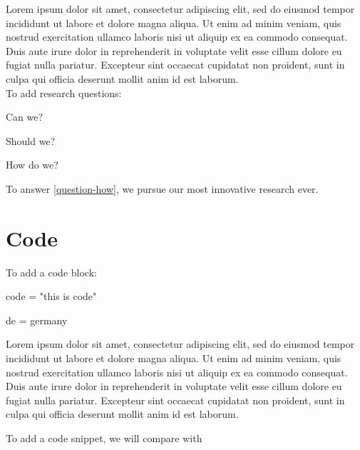 Lorem ipsum dolor sit amet, consectetur adipiscing elit, sed do eiusmod tempor incididunt ut labore et dolore magna aliqua. Ut enim ad minim veniam, quis nostrud exercitation ullamco laboris nisi ut aliquip ex ea commodo consequat. Duis aute irure dolor in reprehenderit in voluptate velit esse cillum dolore eu fugiat nulla pariatur. Excepteur sint occaecat cupidatat non proident, sunt in culpa qui officia deserunt mollit anim id est laborum.\\
To add research questions:


\begin{questions}
 \item Can we? \label{question-can}
 \item Should we? \label{question-should}
 \item How do we? \label{question-how}
\end{questions}

To answer \cref{question-how}, we pursue our most innovative research ever.


\section{Code}

To add a code block:

\begin{code}
  code = "this
   is code"
  
  de = germany
\end{code}



Lorem ipsum dolor sit amet, consectetur adipiscing elit, sed do eiusmod tempor incididunt ut labore et dolore magna aliqua. Ut enim ad minim veniam, quis nostrud exercitation ullamco laboris nisi ut aliquip ex ea commodo consequat. Duis aute irure dolor in reprehenderit in voluptate velit esse cillum dolore eu fugiat nulla pariatur. Excepteur sint occaecat cupidatat non proident, sunt in culpa qui officia deserunt mollit anim id est laborum.


To add a code snippet, we will compare  with 


